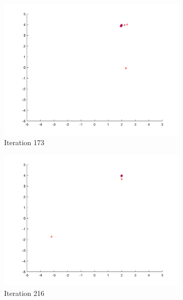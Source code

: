 \begin{figure}
\begin{subfigure}[b]{0.4\textwidth}
    \includegraphics[width=\textwidth]{img/smpl/rosn2d-2-100/loa-iter-173}
    \caption{Iteration 173}
    \label{fig:s5-iter-4}
  \end{subfigure}
  \begin{subfigure}[b]{0.4\textwidth}
    \includegraphics[width=\textwidth]{img/smpl/rosn2d-2-100/loa-iter-216}
    \caption{Iteration 216}
    \label{fig:s5-iter-5}
  \end{subfigure}
  \begin{subfigure}[b]{0.4\textwidth}

\end{subfigure}
\end{figure}
